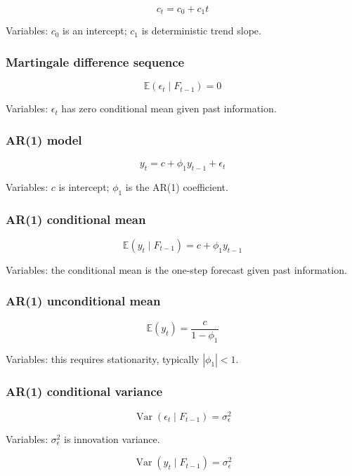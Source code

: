 \documentclass[
  8pt,
  twocolumn]{extarticle}
\begin{document}
\[
c_t=c_0+c_1t
\]

Variables: \(c_0\) is an intercept; \(c_1\) is deterministic trend
slope.

\subsubsection{Martingale difference
sequence}\label{martingale-difference-sequence}

\[
\mathbb E(\epsilon_t\mid F_{t-1})=0
\]

Variables: \(\epsilon_t\) has zero conditional mean given past
information.

\subsubsection{AR(1) model}\label{ar1-model}

\[
y_t=c+\phi_1y_{t-1}+\epsilon_t
\]

Variables: \(c\) is intercept; \(\phi_1\) is the AR(1) coefficient.

\subsubsection{AR(1) conditional mean}\label{ar1-conditional-mean}

\[
\mathbb E(y_t\mid F_{t-1})=c+\phi_1y_{t-1}
\]

Variables: the conditional mean is the one-step forecast given past
information.

\subsubsection{AR(1) unconditional mean}\label{ar1-unconditional-mean}

\[
\mathbb E(y_t)=\frac{c}{1-\phi_1}
\]

Variables: this requires stationarity, typically \(|\phi_1|<1\).

\subsubsection{AR(1) conditional
variance}\label{ar1-conditional-variance}

\[
\operatorname{Var}(\epsilon_t\mid F_{t-1})=\sigma_\epsilon^2
\]

Variables: \(\sigma_\epsilon^2\) is innovation variance.

\[
\operatorname{Var}(y_t\mid F_{t-1})=\sigma_\epsilon^2
\]
\end{document}
